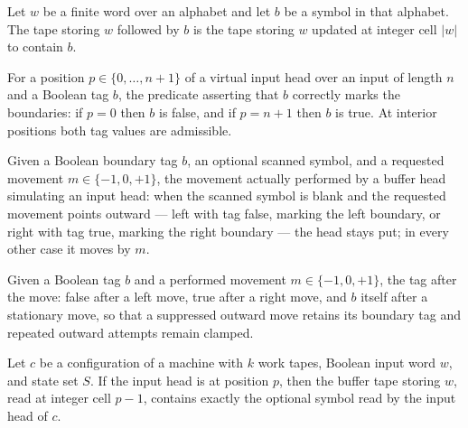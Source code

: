 \begin{lemma}
\label{Turing.FinTM.bufferTape_append}
\leanok
{}
Let $w$ be a finite word over an alphabet and let $b$ be a symbol in that alphabet. The
tape storing $w$ followed by $b$ is the tape storing $w$ updated at integer cell $|w|$
to contain $b$.
\end{lemma}

\begin{definition}
\label{Turing.FinTM.VirtualTag}
\leanok
For a position $p \in \{0,\dots,n+1\}$ of a virtual input head over an input
of length $n$ and a Boolean tag $b$, the predicate asserting that $b$
correctly marks the boundaries: if $p = 0$ then $b$ is false, and if
$p = n + 1$ then $b$ is true.  At interior positions both tag values are
admissible.
\end{definition}

\begin{definition}
\label{Turing.FinTM.virtualMove}
\leanok
Given a Boolean boundary tag $b$, an optional scanned symbol, and a requested
movement $m \in \{-1, 0, +1\}$, the movement actually performed by a buffer
head simulating an input head: when the scanned symbol is blank and the
requested movement points outward --- left with tag false, marking the left
boundary, or right with tag true, marking the right boundary --- the head
stays put; in every other case it moves by $m$.
\end{definition}

\begin{definition}
\label{Turing.FinTM.virtualNextTag}
\leanok
Given a Boolean tag $b$ and a performed movement $m \in \{-1, 0, +1\}$, the
tag after the move: false after a left move, true after a right move, and $b$
itself after a stationary move, so that a suppressed outward move retains its
boundary tag and repeated outward attempts remain clamped.
\end{definition}

\begin{lemma}
\label{Turing.FinTM.bufferTape_inputSymbol}
\leanok
{}
Let $c$ be a configuration of a machine with $k$ work tapes, Boolean input word $w$, and
state set $S$. If the input head is at position $p$, then the buffer tape storing $w$,
read at integer cell $p-1$, contains exactly the optional symbol read by the input head
of $c$.
\end{lemma}

